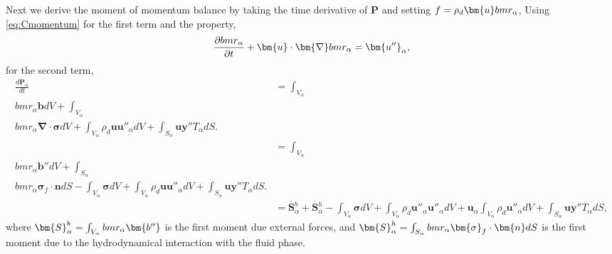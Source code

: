 Next we derive the moment of momentum balance by taking the time derivative of $\bm{P}$ and setting $f =  \rho_d \bm{u} \\bm{r}_\alpha$,
Using \ref{eq:Cmomentum} for the first term and the property,
\begin{equation}
    \frac{\partial  \\bm{r}_\alpha }{\partial t} + \bm{u} \cdot \bm{\nabla}\\bm{r}_\alpha 
    = \bm{u''}_\alpha,
\end{equation}
for the second term,
\begin{align}
    \frac{d\bm{P}_\alpha}{dt} 
    &= \int_{V_\alpha}\\bm{r}_\alpha \bm{b} dV
    + \int_{V_\alpha}\\bm{r}_\alpha \bm{\nabla} \cdot \bm{\sigma} dV
    + \int_{V_\alpha}\rho_d \bm{u} \bm{u''}_\alpha dV
    + \int_{S_\alpha} \bm{u} \bm{y''} T_\alpha dS.\\
    &= \int_{V_\alpha}\\bm{r}_\alpha \bm{b''} dV
    + \int_{S_\alpha}\\bm{r}_\alpha \bm{\sigma}_f \cdot \bm{n} dS
    - \int_{V_\alpha} \bm{\sigma} dV
    + \int_{V_\alpha}\rho_d \bm{u} \bm{u''}_\alpha dV
    + \int_{S_\alpha} \bm{u} \bm{y''} T_\alpha dS.\\
    &=  
     \bm{S}^{b}_\alpha
    + \bm{S}^{h}_\alpha
    - \int_{V_\alpha} \bm{\sigma} dV
    + \int_{V_\alpha}\rho_d \bm{u''}_\alpha \bm{u''}_\alpha dV
    + \bm{u}_\alpha \int_{V_\alpha}\rho_d  \bm{u''}_\alpha dV
    + \int_{S_\alpha} \bm{u} \bm{y''} T_\alpha dS,
\end{align}
where $\bm{S}^{b}_\alpha = \int_{V_\alpha}\\bm{r}_\alpha \bm{b''}$ is the first moment due external forces, and $\bm{S}^{h}_\alpha = \int_{S_\alpha}\\bm{r}_\alpha \bm{\sigma}_f \cdot \bm{n} dS$ is the first moment due to the hydrodynamical interaction with the fluid phase. 

